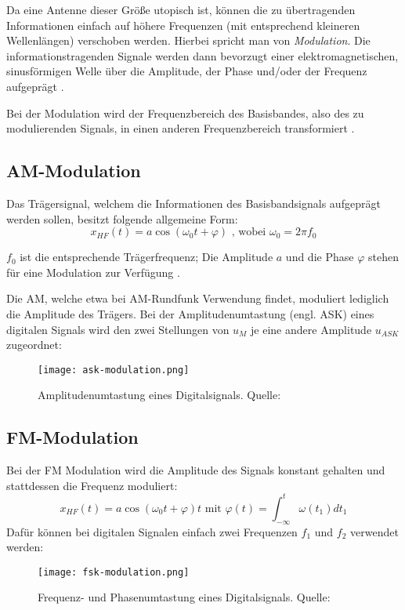 Da eine Antenne dieser Größe utopisch ist, können die zu übertragenden Informationen einfach auf höhere Frequenzen (mit entsprechend kleineren Wellenlängen) verschoben werden. Hierbei spricht man von \textit{Modulation}.
Die informationstragenden Signale werden dann bevorzugt einer elektromagnetischen, sinusförmigen Welle über die Amplitude, der Phase und/oder der Frequenz aufgeprägt \cite[vgl. Werner, S. 242f]{Werner:2017}. %

Bei der Modulation wird der Frequenzbereich des Basisbandes, also des zu modulierenden Signals, in einen anderen Frequenzbereich transformiert \cite[vgl. Plaßmann, S. 1204]{Plassmann:2016}.

\subsection{AM-Modulation}
Das Trägersignal, welchem die Informationen des Basisbandsignals aufgeprägt werden sollen, besitzt folgende allgemeine Form:
\[ x_{HF} (t) = a \cos(\omega_0t + \varphi) \text{ , wobei }\omega_0 = 2\pi f_0 \]

\(f_0\) ist die entsprechende Trägerfrequenz; Die Amplitude \(a\) und die Phase \(\varphi\) stehen für eine Modulation zur Verfügung \cite[vgl. Heuberger, e. a., S. 39]{Heuberger:2017}.

Die \ac{AM}, welche etwa bei AM-Rundfunk Verwendung findet, moduliert lediglich die Amplitude des Trägers. Bei der Amplitudenumtastung (engl. \ac{ASK}) eines digitalen Signals wird den zwei Stellungen von \(u_M\) je eine andere Amplitude \(u_{ASK}\) zugeordnet:

\begin{figure}[ht]
	\centering
	\texttt{[image: ask-modulation.png]}
	\caption[Amplitudenumtastung eines Digitalsignals]{Amplitudenumtastung eines Digitalsignals. Quelle: \cite[Plaßmann, S. 1218]{Plassmann:2016}} 
	\label{ask}
\end{figure}



\subsection{FM-Modulation}
Bei der FM Modulation wird die Amplitude des Signals konstant gehalten und stattdessen die Frequenz moduliert:
\[ x_{HF}(t) = a \cos (\omega_0 t + \varphi)t  \text{  mit } \varphi(t) = \int_{- \infty}^{t} \omega(t_1) dt_1\] 
Dafür können bei digitalen Signalen einfach zwei Frequenzen \(f_1\) und \(f_2\) verwendet werden:
\begin{figure}[ht]
	\centering
	\texttt{[image: fsk-modulation.png]}
	\caption[Frequenz- und Phasenumtastung eines Digitalsignals]{Frequenz- und Phasenumtastung eines Digitalsignals. Quelle: \cite[Plaßmann, S. 1218]{Plassmann:2016}} 
	\label{fsk}
\end{figure}



